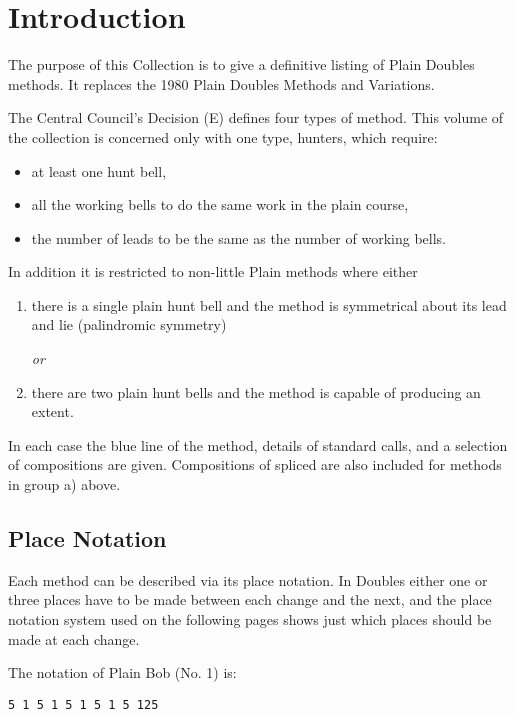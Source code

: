\chapter{Introduction} \label{cha:introduction}

The purpose of this Collection is to give a definitive listing of Plain Doubles
methods.
It replaces the 1980 Plain Doubles Methods and Variations.

The Central Council's Decision (E) defines four types of method.
This volume of the collection is concerned only with one type, hunters,
which require:

\begin{itemize}
  \item at least one hunt bell,
  \item all the working bells to do the same work in the plain course,
  \item the number of leads to be the same as the number of working bells.
\end{itemize}

In addition it is restricted to non-little Plain methods where either

\begin{enumerate}
  \item there is a single plain hunt bell and the method is symmetrical about
  its lead and lie (palindromic symmetry)

  \emph{or}

  \item there are two plain hunt bells and the method is capable of producing an
  extent.
\end{enumerate}

In each case the blue line of the method, details of standard calls,
and a selection of compositions are given.
Compositions of spliced are also included for methods in group a) above.

\section{Place Notation} \label{sec:place-notation}

Each method can be described via its place notation.
In Doubles either one or three places have to be made between each change and
the next, and the place notation system used on the following pages shows just
which places should be made at each change.

The notation of Plain Bob (No. 1) is:

\begin{verbatim}
5 1 5 1 5 1 5 1 5 125
\end{verbatim}

